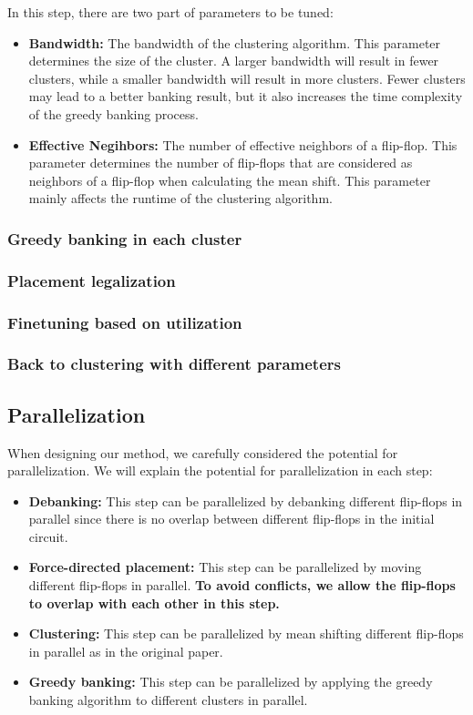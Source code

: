 \documentclass[12pt]{article}
\begin{document}
In this step, there are two part of parameters to be tuned:
\begin{itemize}
    \item \textbf{Bandwidth:} The bandwidth of the clustering algorithm. This parameter determines the size of the cluster. A larger bandwidth will result in fewer clusters, while a smaller bandwidth will result in more clusters. Fewer clusters may lead to a better banking result, but it also increases the time complexity of the greedy banking process.
    \item \textbf{Effective Negihbors:} The number of effective neighbors of a flip-flop. This parameter determines the number of flip-flops that are considered as neighbors of a flip-flop when calculating the mean shift. This parameter mainly affects the runtime of the clustering algorithm.
\end{itemize}

\subsubsection{Greedy banking in each cluster}

\subsubsection{Placement legalization}

\subsubsection{Finetuning based on utilization}

\subsubsection{Back to clustering with different parameters}

\subsection{Parallelization}

When designing our method, we carefully considered the potential for parallelization. We will explain the potential for parallelization in each step:

\begin{itemize}
    \item \textbf{Debanking:} This step can be parallelized by debanking different flip-flops in parallel since there is no overlap between different flip-flops in the initial circuit.
    \item \textbf{Force-directed placement:} This step can be parallelized by moving different flip-flops in parallel. \textbf{To avoid conflicts, we allow the flip-flops to overlap with each other in this step.}
    \item \textbf{Clustering:} This step can be parallelized by mean shifting different flip-flops in parallel as in the original paper.
    \item \textbf{Greedy banking:} This step can be parallelized by applying the greedy banking algorithm to different clusters in parallel.
\end{itemize}
\end{document}
